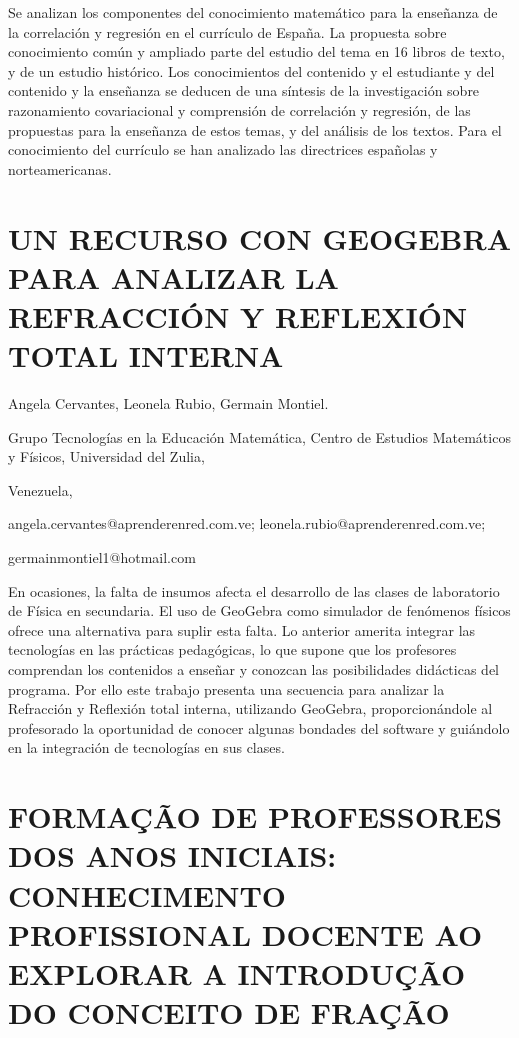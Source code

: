 Se analizan los componentes del conocimiento matemático para la enseñanza
de la correlación y regresión en el currículo de España. La propuesta
sobre conocimiento común y ampliado parte del estudio del tema en
16 libros de texto, y de un estudio histórico. Los conocimientos del
contenido y el estudiante y del contenido y la enseñanza se deducen
de una síntesis de la investigación sobre razonamiento covariacional
y comprensión de correlación y regresión, de las propuestas para la
enseñanza de estos temas, y del análisis de los textos. Para el conocimiento
del currículo se han analizado las directrices españolas y norteamericanas.


\section{UN RECURSO CON GEOGEBRA PARA ANALIZAR LA REFRACCIÓN Y REFLEXIÓN TOTAL
INTERNA}

\begin{datos}

Angela Cervantes, Leonela Rubio, Germain Montiel.

Grupo Tecnologías en la Educación Matemática, Centro de Estudios Matemáticos
y Físicos, Universidad del Zulia,

Venezuela,

angela.cervantes@aprenderenred.com.ve; leonela.rubio@aprenderenred.com.ve;

germainmontiel1@hotmail.com 

\end{datos}

En ocasiones, la falta de insumos afecta el desarrollo de las clases
de laboratorio de Física en secundaria. El uso de GeoGebra como simulador
de fenómenos físicos ofrece una alternativa para suplir esta falta.
Lo anterior amerita integrar las tecnologías en las prácticas pedagógicas,
lo que supone que los profesores comprendan los contenidos a enseñar
y conozcan las posibilidades didácticas del programa. Por ello este
trabajo presenta una secuencia para analizar la Refracción y Reflexión
total interna, utilizando GeoGebra, proporcionándole al profesorado
la oportunidad de conocer algunas bondades del software y guiándolo
en la integración de tecnologías en sus clases. 


\section{FORMAÇÃO DE PROFESSORES DOS ANOS INICIAIS: CONHECIMENTO PROFISSIONAL
DOCENTE AO EXPLORAR A INTRODUÇÃO DO CONCEITO DE FRAÇÃO}

